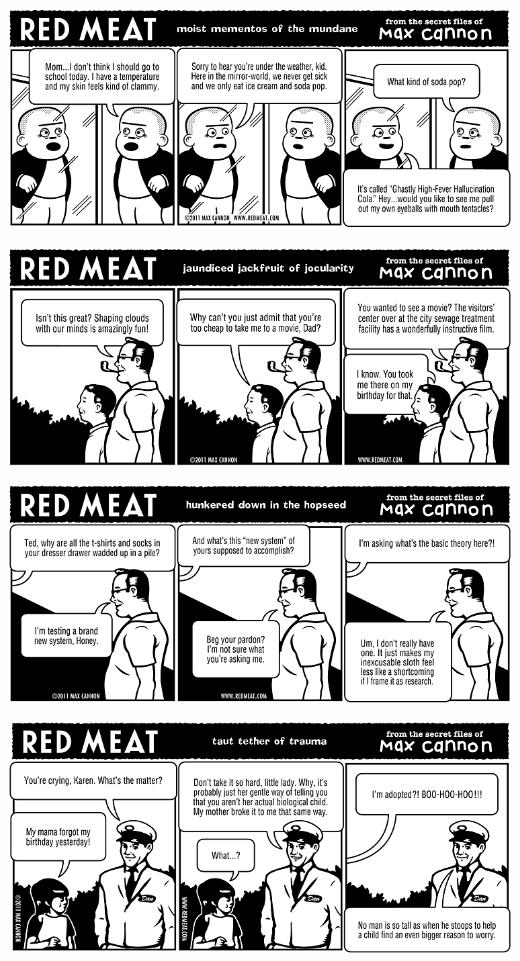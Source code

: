 \documentclass[a4paper,twoside,11pt]{article}
\begin{document}
\includegraphics[width=\textwidth]{redmeat_2011-05-31.png}



\includegraphics[width=\textwidth]{redmeat_2011-06-07.png}



\includegraphics[width=\textwidth]{redmeat_2011-06-14.png}



\includegraphics[width=\textwidth]{redmeat_2011-06-21.png}
\end{document}

